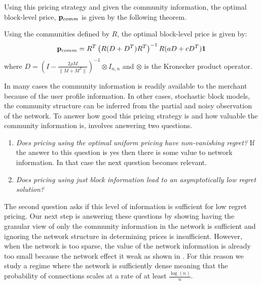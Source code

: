 Using this pricing strategy and given the community information, the optimal block-level price, $\mathbf{p}_{comm}$ is given by the following theorem. 
\begin{theorem}\label{prop:group_pricing}
    Using the communities defined by $R$, the optimal block-level price is given by:
    \newcommand{\D}{D}
    \begin{equation*}
        \mathbf{p}_{comm} = R^T \left( R (D+D^T) R^T\right)^{-1} R (a D + cD^T) \mathbf{1} 
    \end{equation*}
    where $D = \left( I - \frac{2\rho M}{\| M+M^T\|}\right)^{-1} \otimes I_{n,n} $ and $\otimes $ is the Kronecker product operator.
\end{theorem}

 In many cases the community information is readily available to the merchant because of the user profile information. In other cases, stochastic block models, the community structure can be inferred from the partial and noisy observation of the network. To answer how good this pricing strategy is and how valuable the community information is, involves answering two questions.
\begin{enumerate}
    \item \emph{Does pricing using the optimal uniform pricing have non-vanishing regret?} If the answer to this question is yes then there is some value to network information. In that case the next question becomes relevant.
    \item \emph{Does pricing using just block information lead to an asymptotically low regret solution?}
\end{enumerate}
The second question asks if this level of information is sufficient for low regret pricing. Our next step is answering these questions by showing having the granular view of only the community information in the network is sufficient and ignoring the network structure in determining prices is insufficient. However, when the network is too sparse, the value of the network information is already too small because the network effect it weak as shown in \cite{huang2022value}. For this reason we study a regime where the network is sufficiently dense meaning that the probability of connections scales at a rate of at least $\frac{\log(n)}{n}$.  

